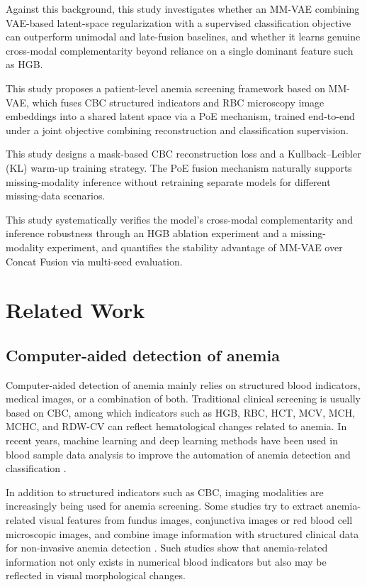 \documentclass[conference]{IEEEtran}
\begin{document}
Against this background, this study investigates whether an MM-VAE combining VAE-based latent-space regularization with a supervised classification objective can outperform unimodal and late-fusion baselines, and whether it learns genuine cross-modal complementarity beyond reliance on a single dominant feature such as HGB.

This study proposes a patient-level anemia screening framework based on MM-VAE, which fuses CBC structured indicators and RBC microscopy image embeddings into a shared latent space via a PoE mechanism, trained end-to-end under a joint objective combining reconstruction and classification supervision.

This study designs a mask-based CBC reconstruction loss and a Kullback--Leibler (KL) warm-up training strategy. The PoE fusion mechanism naturally supports missing-modality inference without retraining separate models for different missing-data scenarios.

This study systematically verifies the model's cross-modal complementarity and inference robustness through an HGB ablation experiment and a missing-modality experiment, and quantifies the stability advantage of MM-VAE over Concat Fusion via multi-seed evaluation.

\section{Related Work}

\subsection{Computer-aided detection of anemia}

Computer-aided detection of anemia mainly relies on structured blood indicators, medical images, or a combination of both. Traditional clinical screening is usually based on CBC, among which indicators such as HGB, RBC, HCT, MCV, MCH, MCHC, and RDW-CV can reflect hematological changes related to anemia. In recent years, machine learning and deep learning methods have been used in blood sample data analysis to improve the automation of anemia detection and classification \cite{ref4}.

In addition to structured indicators such as CBC, imaging modalities are increasingly being used for anemia screening. Some studies try to extract anemia-related visual features from fundus images, conjunctiva images or red blood cell microscopic images, and combine image information with structured clinical data for non-invasive anemia detection \cite{ref5}. Such studies show that anemia-related information not only exists in numerical blood indicators but also may be reflected in visual morphological changes.
\end{document}
